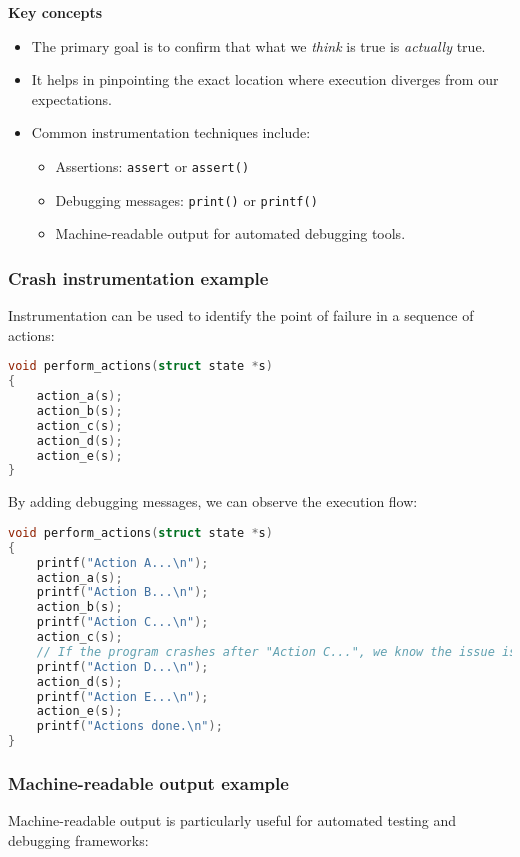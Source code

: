 \documentclass[12pt]{article}
\begin{document}
\textbf{Key concepts}
\begin{itemize}
    \item The primary goal is to confirm that what we \textit{think} is true is \textit{actually} true.
    \item It helps in pinpointing the exact location where execution diverges from our expectations.
    \item Common instrumentation techniques include:
    \begin{itemize}
        \item Assertions: \lstinline|assert| or \lstinline|assert()|
        \item Debugging messages: \lstinline|print()| or \lstinline|printf()|
        \item Machine-readable output for automated debugging tools.
    \end{itemize}
\end{itemize}

\subsubsection{Crash instrumentation example}

Instrumentation can be used to identify the point of failure in a sequence of actions:

\begin{lstlisting}[language=C]
void perform_actions(struct state *s)
{
    action_a(s);
    action_b(s);
    action_c(s);
    action_d(s);
    action_e(s);
}
\end{lstlisting}

By adding debugging messages, we can observe the execution flow:

\begin{lstlisting}[language=C]
void perform_actions(struct state *s)
{
    printf("Action A...\n");
    action_a(s);
    printf("Action B...\n");
    action_b(s);
    printf("Action C...\n");
    action_c(s);
    // If the program crashes after "Action C...", we know the issue is in action_c()
    printf("Action D...\n");
    action_d(s);
    printf("Action E...\n");
    action_e(s);
    printf("Actions done.\n");
}
\end{lstlisting}

\subsubsection{Machine-readable output example}
Machine-readable output is particularly useful for automated testing and debugging frameworks:
\end{document}
